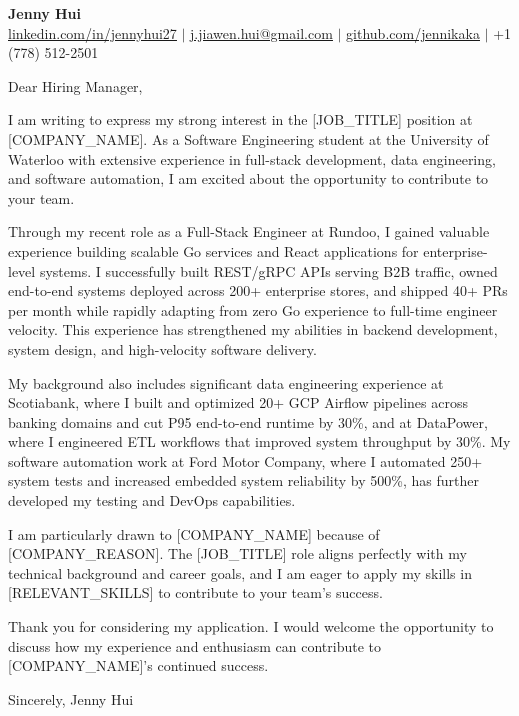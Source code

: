 \documentclass[letterpaper,11pt]{article}
\begin{document}
\begin{center}
    \textbf{\Huge Jenny Hui} \\ \vspace{1pt}
    \small \href{https://linkedin.com/in/jennyhui27}{\underline{linkedin.com/in/jennyhui27}} $|$  \href{mailto:j.jiawen.hui@gmail.com}{\underline{j.jiawen.hui@gmail.com}} $|$
    \href{https://github.com/jennikaka}{\underline{github.com/jennikaka}} $|$ +1 (778) 512-2501
\end{center}

\vspace{1em}

Dear Hiring Manager,

I am writing to express my strong interest in the [JOB_TITLE] position at [COMPANY_NAME]. As a Software Engineering student at the University of Waterloo with extensive experience in full-stack development, data engineering, and software automation, I am excited about the opportunity to contribute to your team.

Through my recent role as a Full-Stack Engineer at Rundoo, I gained valuable experience building scalable Go services and React applications for enterprise-level systems. I successfully built REST/gRPC APIs serving B2B traffic, owned end-to-end systems deployed across 200+ enterprise stores, and shipped 40+ PRs per month while rapidly adapting from zero Go experience to full-time engineer velocity. This experience has strengthened my abilities in backend development, system design, and high-velocity software delivery.

My background also includes significant data engineering experience at Scotiabank, where I built and optimized 20+ GCP Airflow pipelines across banking domains and cut P95 end-to-end runtime by 30\%, and at DataPower, where I engineered ETL workflows that improved system throughput by 30\%. My software automation work at Ford Motor Company, where I automated 250+ system tests and increased embedded system reliability by 500\%, has further developed my testing and DevOps capabilities.

I am particularly drawn to [COMPANY_NAME] because of [COMPANY_REASON]. The [JOB_TITLE] role aligns perfectly with my technical background and career goals, and I am eager to apply my skills in [RELEVANT_SKILLS] to contribute to your team's success.

Thank you for considering my application. I would welcome the opportunity to discuss how my experience and enthusiasm can contribute to [COMPANY_NAME]'s continued success.

Sincerely,
Jenny Hui
\end{document}
